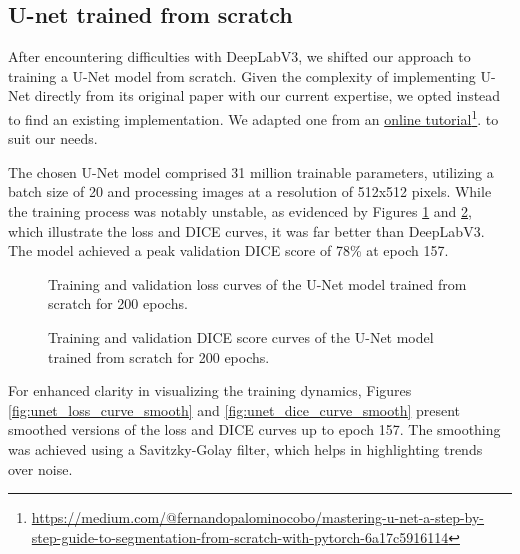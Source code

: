 \subsection{U-net trained from scratch}
After encountering difficulties with DeepLabV3, we shifted our approach to training a U-Net model from scratch. 
Given the complexity of implementing U-Net directly from its original paper with our current expertise, we opted 
instead to find an existing implementation. We adapted one from an \href{https://medium.com/@fernandopalominocobo/mastering-u-net-a-step-by-step-guide-to-segmentation-from-scratch-with-pytorch-6a17c5916114}{online tutorial}\footnote{\href{https://medium.com/@fernandopalominocobo/mastering-u-net-a-step-by-step-guide-to-segmentation-from-scratch-with-pytorch-6a17c5916114}{https://medium.com/@fernandopalominocobo/mastering-u-net-a-step-by-step-guide-to-segmentation-from-scratch-with-pytorch-6a17c5916114}}.
to suit our needs. 

The chosen U-Net model comprised 31 million trainable parameters, utilizing a batch size of 20 and processing 
images at a resolution of 512x512 pixels. While the training process was notably unstable, as evidenced by Figures 
\ref{fig:unet_loss_curve} and \ref{fig:unet_dice_curve}, which illustrate the loss and DICE curves, it was far 
better than DeepLabV3. The model achieved a peak validation DICE score of 78\% at epoch 157. 

\begin{figure}[ht]
    \centering
    \caption{Training and validation loss curves of the U-Net model trained from scratch for 200 epochs.}
    \label{fig:unet_loss_curve}
\end{figure}

\begin{figure}[ht]
    \centering
    \caption{Training and validation DICE score curves of the U-Net model trained from scratch for 200 epochs.}
    \label{fig:unet_dice_curve}
\end{figure}


For enhanced clarity in visualizing the training dynamics, Figures \ref{fig:unet_loss_curve_smooth} and 
\ref{fig:unet_dice_curve_smooth} present smoothed versions of the loss and DICE curves up to epoch 157. 
The smoothing was achieved using a Savitzky-Golay filter, which helps in highlighting trends over noise. 


